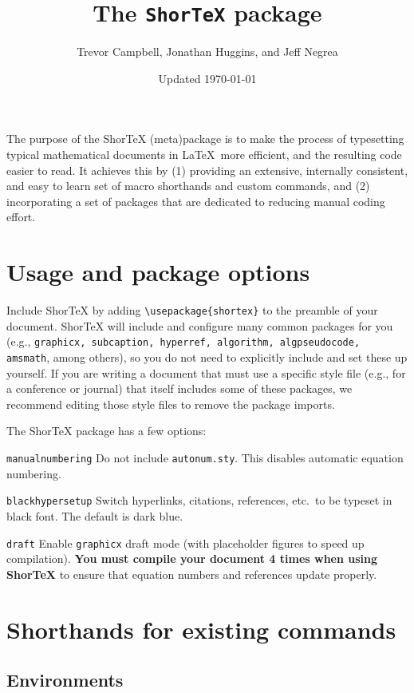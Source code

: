 \documentclass{article}
\title{The \texttt{ShorTeX} package}
\author{Trevor Campbell, Jonathan Huggins, and Jeff Negrea}
\date{Updated \today}
\begin{document}
\maketitle


\babs
The purpose of the ShorTeX (meta)package is to make the process of typesetting
typical mathematical documents in \LaTeX~more efficient, and the resulting
code easier to read.  It achieves this by 
(1) providing an
extensive, internally consistent, and easy to learn set of macro
shorthands and custom commands, and 
(2) incorporating a set of packages that are
dedicated to reducing manual coding effort.
\eabs


\tableofcontents

\section{Usage and package options}\label{sec:usage}


Include ShorTeX by adding \verb!\usepackage{shortex}! to the preamble of your document.
ShorTeX will include and configure many common packages for you (e.g., \texttt{graphicx, subcaption, hyperref, algorithm, algpseudocode, amsmath}, among others),
so you do not need to explicitly include and set these up yourself.
If you are writing a document that must use a specific style file (e.g., for a conference or journal) that itself
includes some of these packages, we recommend editing those style files to remove the package imports.

The ShorTeX package has a few options:
\bdesc
\item[\texttt{manualnumbering}] Do not include \texttt{autonum.sty}. This disables automatic equation numbering.
\item[\texttt{blackhypersetup}] Switch hyperlinks, citations, references, etc.~to be typeset in black font. The default is dark blue.
\item[\texttt{draft}] Enable \texttt{graphicx} draft mode (with placeholder figures to speed up compilation).
\edesc
\textbf{You must compile your document 4 times when using ShorTeX} to ensure that equation
numbers and references update properly.

\section{Shorthands for existing commands}

\subsection{Environments}
\end{document}
